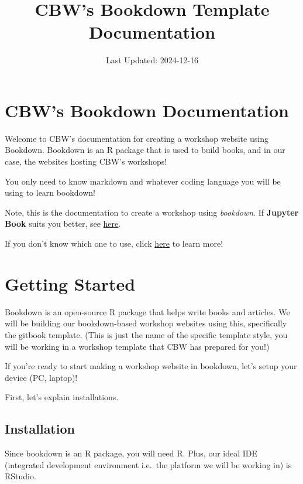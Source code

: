 \documentclass[
]{book}
\title{CBW's Bookdown Template Documentation}
\author{}
\date{\vspace{-2.5em}Last Updated: 2024-12-16}
\theoremstyle{definition}
\theoremstyle{definition}
\theoremstyle{definition}
\theoremstyle{definition}
\theoremstyle{remark}
\begin{document}
\maketitle

{
\setcounter{tocdepth}{1}
\tableofcontents
}
\chapter{CBW's Bookdown Documentation}\label{cbws-bookdown-documentation}

Welcome to CBW's documentation for creating a workshop website using Bookdown. Bookdown is an R package that is used to build books, and in our case, the websites hosting CBW's workshops!

You only need to know markdown and whatever coding language you will be using to learn bookdown!

Note, this is the documentation to create a workshop using \emph{bookdown}. If \textbf{Jupyter Book} suits you better, see \href{https://cbw-dev.github.io/jupyterbook-docs/}{here}.

If you don't know which one to use, click \href{}{here} to learn more!

\chapter{Getting Started}\label{get-started}

Bookdown is an open-source R package that helps write books and articles. We will be building our bookdown-based workshop websites using this, specifically the gitbook template. (This is just the name of the specific template style, you will be working in a workshop template that CBW has prepared for you!)

If you're ready to start making a workshop website in bookdown, let's setup your device (PC, laptop)!

First, let's explain installations.

\section{Installation}\label{installation}

Since bookdown is an R package, you will need R. Plus, our ideal IDE (integrated development environment i.e.~the platform we will be working in) is RStudio.
\end{document}
